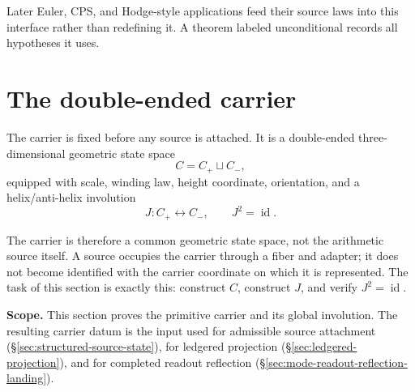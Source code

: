 \documentclass[11pt]{article}
\theoremstyle{definition}
\begin{document}
Later Euler, CPS, and Hodge-style applications feed their source laws into
this interface rather than redefining it.  A theorem labeled unconditional
records all hypotheses it uses.

\section{The double-ended carrier}\label{sec:common-carrier}

The carrier is fixed before any source is attached.  It is a double-ended
three-dimensional geometric state space
\[
C=C_+\sqcup C_-,
\]
equipped with scale, winding law, height coordinate, orientation, and a
helix/anti-helix involution
\[
J:C_+\leftrightarrow C_-,
\qquad
J^2=\operatorname{id}.
\]

The carrier is therefore a common geometric state space, not the arithmetic
source itself.  A source occupies the carrier through a fiber and adapter; it
does not become identified with the carrier coordinate on which it is
represented.  The task of this section is exactly this:
construct \(C\), construct \(J\), and verify \(J^2=\operatorname{id}\).

\noindent\textbf{Scope.}
This section proves the primitive carrier and its global involution.  The
resulting carrier datum is the input used for admissible source attachment
(\S\ref{sec:structured-source-state}), for ledgered projection
(\S\ref{sec:ledgered-projection}), and for completed readout reflection
(\S\ref{sec:mode-readout-reflection-landing}).
\end{document}
